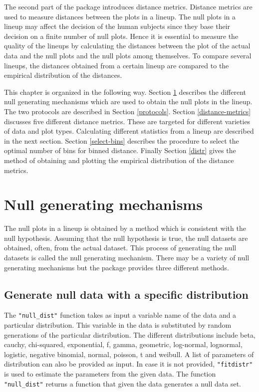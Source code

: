 The second part of the package introduces distance metrics. Distance metrics are used to measure distances between the plots in a lineup.  The null plots in a lineup may affect the decision of the human subjects since they base their decision on a finite number of null plots. Hence it is essential to measure the quality of the lineups by calculating the distances between the plot of the actual data and the null plots and the null plots among themselves. To compare several lineups, the distances obtained from a certain lineup are compared to the empirical distribution of the distances. 

This chapter is organized in the following way. Section \ref{null-gen} describes the different null generating mechanisms which are used to obtain the null plots in the lineup. The two protocols are described in Section \ref{protocols}. Section \ref{distance-metrics} discusses five different distance metrics. These are targeted for different varieties of data and plot types. Calculating different statistics from a lineup are described in the next section. Section \ref{select-bins} describes the procedure to select the optimal number of bins for binned distance. Finally Section \ref{distr} gives the method of obtaining and plotting the empirical distribution of the distance metrics.


\section{Null generating mechanisms}\label{null-gen}

The null plots in a lineup is obtained by a method which is consistent with the null hypothesis. Assuming that the null hypothesis is true, the null datasets are obtained, often, from the actual dataset. This process of generating the null datasets is called the null generating mechanism. There may be a variety of null generating mechanisms but the package provides
three different methods.

\subsection{Generate null data with a specific
distribution}\label{generate-null-data-with-a-specific-distribution}

The \texttt{"null\_dist"} function takes as input a variable name of the
data and a particular distribution. This variable in the data is
substituted by random generations of the particular distribution. The
different distributions include beta, cauchy, chi-squared, exponential,
f, gamma, geometric, log-normal, lognormal, logistic, negative binomial,
normal, poisson, t and weibull. A list of parameters of distribution can
also be provided as input. In case it is not provided,
\texttt{"fitdistr"} is used to estimate the parameters from the given
data. The function \texttt{"null\_dist"} returns a function that given
the data generates a null data set.

